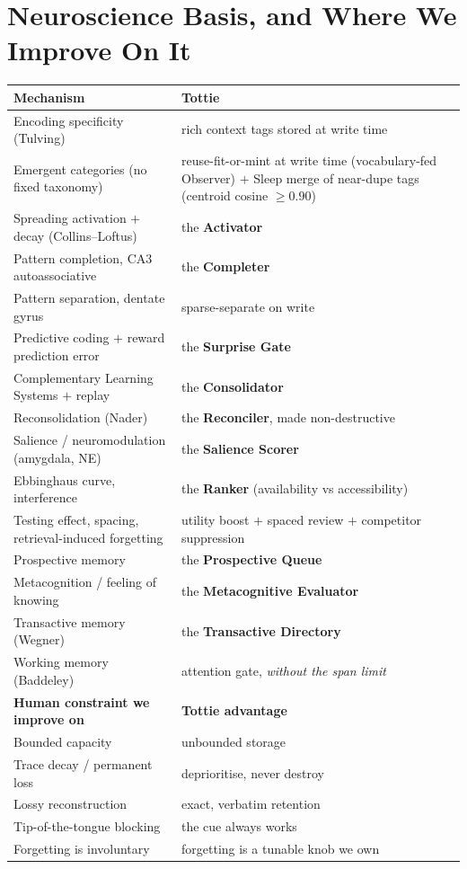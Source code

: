 \section{Neuroscience Basis, and Where We Improve On It}
\begin{longtable}{@{}p{}p{}@{}}
\toprule
Mechanism & Tottie \\
\midrule
Encoding specificity (Tulving) & rich context tags stored at write time \\
Emergent categories (no fixed taxonomy) & reuse-fit-or-mint at write time (vocabulary-fed Observer) $+$ Sleep merge of near-dupe tags (centroid cosine $\geq 0.90$) \\
Spreading activation $+$ decay (Collins--Loftus) & the \textbf{Activator} \\
Pattern completion, CA3 autoassociative & the \textbf{Completer} \\
Pattern separation, dentate gyrus & sparse-separate on write \\
Predictive coding $+$ reward prediction error & the \textbf{Surprise Gate} \\
Complementary Learning Systems $+$ replay & the \textbf{Consolidator} \\
Reconsolidation (Nader) & the \textbf{Reconciler}, made non-destructive \\
Salience / neuromodulation (amygdala, NE) & the \textbf{Salience Scorer} \\
Ebbinghaus curve, interference & the \textbf{Ranker} (availability vs accessibility) \\
Testing effect, spacing, retrieval-induced forgetting & utility boost $+$ spaced review $+$ competitor suppression \\
Prospective memory & the \textbf{Prospective Queue} \\
Metacognition / feeling of knowing & the \textbf{Metacognitive Evaluator} \\
Transactive memory (Wegner) & the \textbf{Transactive Directory} \\
Working memory (Baddeley) & attention gate, \emph{without the span limit} \\
\midrule
\textbf{Human constraint we improve on} & \textbf{Tottie advantage} \\
Bounded capacity & unbounded storage \\
Trace decay / permanent loss & deprioritise, never destroy \\
Lossy reconstruction & exact, verbatim retention \\
Tip-of-the-tongue blocking & the cue always works \\
Forgetting is involuntary & forgetting is a tunable knob we own \\
\bottomrule
\end{longtable}

